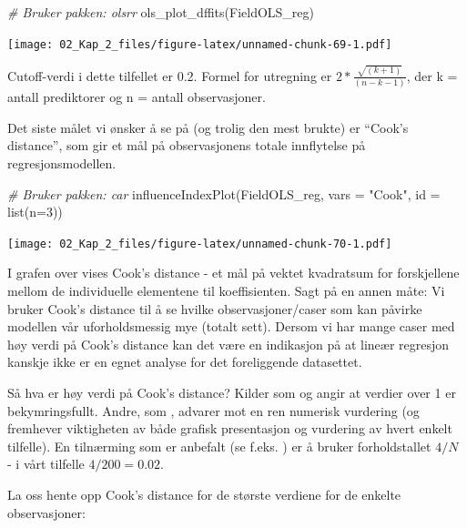 \documentclass[
]{article}
\newenvironment{Shaded}{\begin{snugshade}}{\end{snugshade}}
\newcommand{\AttributeTok}[1]{\textcolor[rgb]{0.77,0.63,0.00}{#1}}
\newcommand{\CommentTok}[1]{\textcolor[rgb]{0.56,0.35,0.01}{\textit{#1}}}
\newcommand{\DecValTok}[1]{\textcolor[rgb]{0.00,0.00,0.81}{#1}}
\newcommand{\FunctionTok}[1]{\textcolor[rgb]{0.00,0.00,0.00}{#1}}
\newcommand{\NormalTok}[1]{#1}
\newcommand{\StringTok}[1]{\textcolor[rgb]{0.31,0.60,0.02}{#1}}
\begin{document}
\begin{Shaded}
\begin{Highlighting}[]
\CommentTok{\# Bruker pakken: olsrr}
\FunctionTok{ols\_plot\_dffits}\NormalTok{(FieldOLS\_reg)}
\end{Highlighting}
\end{Shaded}

\texttt{[image: 02\_Kap\_2\_files/figure-latex/unnamed-chunk-69-1.pdf]}

Cutoff-verdi i dette tilfellet er 0.2. Formel for utregning er \(2*\frac{\sqrt{(k+1)}}{(n-k-1)}\), der k = antall prediktorer og n = antall observasjoner.

Det siste målet vi ønsker å se på (og trolig den mest brukte) er ``Cook's distance'', som gir et mål på observasjonens totale innflytelse på regresjonsmodellen.

\begin{Shaded}
\begin{Highlighting}[]
\CommentTok{\# Bruker pakken: car}
\FunctionTok{influenceIndexPlot}\NormalTok{(FieldOLS\_reg, }\AttributeTok{vars =} \StringTok{"Cook"}\NormalTok{, }\AttributeTok{id =} \FunctionTok{list}\NormalTok{(}\AttributeTok{n=}\DecValTok{3}\NormalTok{))}
\end{Highlighting}
\end{Shaded}

\texttt{[image: 02\_Kap\_2\_files/figure-latex/unnamed-chunk-70-1.pdf]}

I grafen over vises Cook's distance - et mål på vektet kvadratsum for forskjellene mellom de individuelle elementene til koeffisienten. Sagt på en annen måte: Vi bruker Cook's distance til å se hvilke observasjoner/caser som kan påvirke modellen vår uforholdsmessig mye (totalt sett). Dersom vi har mange caser med høy verdi på Cook's distance kan det være en indikasjon på at lineær regresjon kanskje ikke er en egnet analyse for det foreliggende datasettet.

Så hva er høy verdi på Cook's distance? Kilder som \citet{cookResidualsInfluenceRegression1982} og \citet{tabachnikUsingMultivariateStatistics2007} angir at verdier over 1 er bekymringsfullt. Andre, som \citet{foxRegressionDiagnosticsIntroduction2020}, advarer mot en ren numerisk vurdering (og fremhever viktigheten av både grafisk presentasjon og vurdering av hvert enkelt tilfelle). En tilnærming som er anbefalt (se f.eks. \citet{zachHowIdentifyInfluential2019}) er å bruker forholdstallet \(4/N\) - i vårt tilfelle \(4/200=0.02\).

La oss hente opp Cook's distance for de største verdiene for de enkelte observasjoner:
\end{document}
